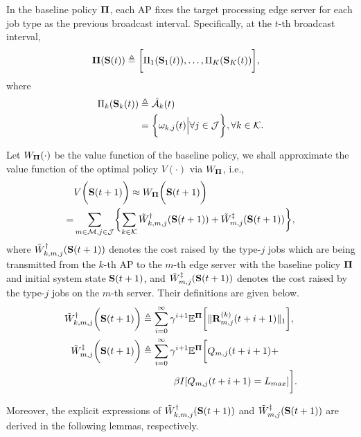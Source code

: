 \begin{policy}
    In the baseline policy $\boldsymbol{\Pi}$, each AP fixes the target processing edge server for each job type as the previous broadcast interval. Specifically, at the $t$-th broadcast interval,
    \begin{align}
        \boldsymbol{\Pi}(\mathbf{S}(t)) &\triangleq \bigg[ \Pi_{1}(\mathbf{S}_{1}(t)), \dots, \Pi_{K}(\mathbf{S}_{K}(t)) \bigg],
    \end{align}
    where 
    \begin{align}
        \Pi_{k}(\mathbf{S}_{k}(t)) &\triangleq
        \hat{\mathcal{A}}_{k}(t)
        \nonumber\\
        &= \bigg\{
            \omega_{k,j}(t) \Big| \forall j\in\mathcal{J}
        \bigg\}, \forall k\in\mathcal{K}.
    \end{align}
\end{policy}

Let $W_{\boldsymbol{\Pi}}(\cdot)$ be the value function of the baseline policy, we shall approximate the value function of the optimal policy $V(\cdot)$ via $W_{\boldsymbol{\Pi}}$, i.e.,
{\small
\begin{align}
    &V\Paren{\Stat(t+1)} \approx W_{\Baseline}\Paren{\Stat(t+1)}
    \nonumber\\
    =& \sum_{m\in\esSet,j\in\jSpace}\Brace{
        \sum_{k\in\apSet} \tilde{W}^{\AP}_{k,m,j}(\Stat(t+1))
        +\tilde{W}^{\ES}_{m,j}(\Stat(t+1))
    },
\end{align}
}
where $\tilde{W}^{\dagger}_{k,m,j}(\mathbf{S}(t+1))$ denotes the cost raised by the type-$j$ jobs which are being transmitted from the $k$-th AP to the $m$-th edge server with the baseline policy $\boldsymbol{\Pi}$ and initial system state $\mathbf{S}(t+1)$, and $\tilde{W}^{\ddagger}_{m,j}(\mathbf{S}(t+1))$ denotes the cost raised by the type-$j$ jobs on the $m$-th server.
Their definitions are given below.
{\small
\begin{align}
    \tilde{W}^{\dagger}_{k,m,j} \bigg(\mathbf{S}(t+1)\bigg) &\triangleq
        \sum_{i=0}^{\infty} \gamma^{i+1} \mathbb{E}^{\boldsymbol{\Pi}}\bigg[
            \lVert\mathbf{R}^{(k)}_{m,j}(t+i+1)\|_1
        \bigg],
    \\    
    \tilde{W}^{\ddagger}_{m,j} \bigg(\mathbf{S}(t+1)\bigg) &\triangleq
        \sum_{i=0}^{\infty} \gamma^{i+1} \mathbb{E}^{\boldsymbol{\Pi}}\bigg[
            Q_{m,j}(t+i+1) +
            \nonumber\\
            &~~~~~~~~~~\beta I[Q_{m,j}(t+i+1) = L_{max}]
        \bigg].
\end{align}
}

Moreover, the explicit expressions of $\tilde{W}^{\dagger}_{k,m,j}(\mathbf{S}(t+1))$ and $\tilde{W}^{\ddagger}_{m,j}(\mathbf{S}(t+1))$ are derived in the following lemmas, respectively.

